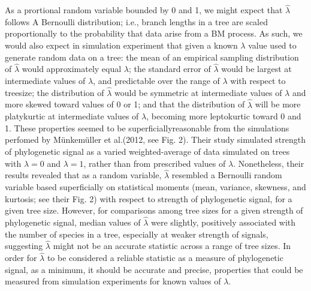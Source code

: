 \documentclass[]{article}
\begin{document}
As a prortional random variable bounded by 0 and 1, we might expect that
\(\hat{\lambda}\) follows A Bernoulli distribution; i.e., branch lengths
in a tree are scaled proportionally to the probability that data arise
from a BM process. As such, we would also expect in simulation
experiment that given a known \(\lambda\) value used to generate random
data on a tree: the mean of an empirical sampling distribution of
\(\hat{\lambda}\) would approximately equal \(\lambda\); the standard
error of \(\hat{\lambda}\) would be largest at intermediate values of
\(\lambda\), and predictable over the range of \(\lambda\) with respect
to treesize; the distribution of \(\hat{\lambda}\) would be symmetric at
intermediate values of \(\lambda\) and more skewed toward values of 0 or
1; and that the distribution of \(\hat{\lambda}\) will be more
platykurtic at intermediate values of \(\lambda\), becoming more
leptokurtic toward 0 and 1. These properties seemed to be
superficiallyreasonable from the simulations perfomed by Münkemüller et
al.(2012, see Fig. 2). Their study simulated strength of phylogenetic
signal as a varied weighted-average of data simulated on trees with
\(\lambda=0\) and \(\lambda=1\), rather than from prescribed values of
\(\lambda\). Nonetheless, their results revealed that as a random
variable, \(\hat{\lambda}\) resembled a Bernoulli random variable based
superficially on statistical moments (mean, variance, skewness, and
kurtosis; see their Fig. 2) with respect to strength of phylogenetic
signal, for a given tree size. However, for comparisons among tree sizes
for a given strength of phylogenetic signal, median values of
\(\hat{\lambda}\) were slightly, positively associated with the number
of species in a tree, especially at weaker strength of signals,
suggesting \(\hat{\lambda}\) might not be an accurate statistic across a
range of tree sizes. In order for \(\hat{\lambda}\) to be considered a
reliable statistic as a measure of phylogenetic signal, as a minimum, it
should be accurate and precise, properties that could be measured from
simulation experiments for known values of \(\lambda\).
\end{document}
